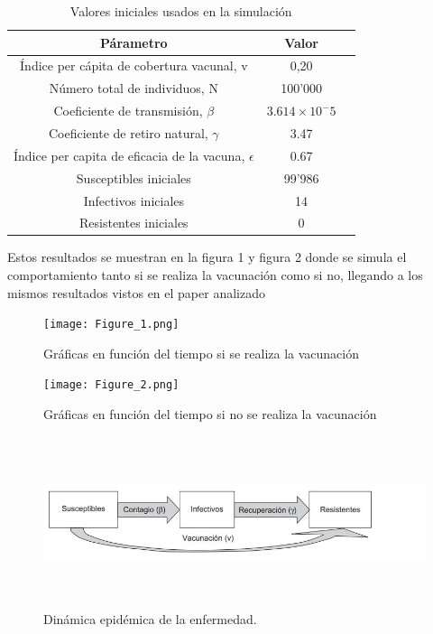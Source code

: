 \documentclass{wscpaperproc}
\theoremstyle{wsc}
\begin{document}
\begin{table}[htbp]
  \centering
  \caption{Valores iniciales usados en la simulación}
  \begin{tabular}{|c|c|c|}
    \hline
    \textbf{Párametro} & \textbf{Valor} \\
    \hline
    Índice per cápita de cobertura vacunal, v & 0,20 \\
    Número total de individuos, N & 100'000\\
	Coeficiente de transmisión, $\beta$ & $ 3.614\times10^-5$\\
	Coeficiente de retiro natural, $\gamma$ & 3.47\\
	Índice per capita de eficacia de la vacuna, $\epsilon$ & 0.67\\
	Susceptibles iniciales &99'986\\
	Infectivos iniciales & 14\\
	Resistentes iniciales & 0\\
    \hline
  \end{tabular}
\end{table}

Estos resultados se muestran en la figura 1 y figura 2 donde se simula
el comportamiento tanto si se realiza la vacunación como si no, llegando
a los mismos resultados vistos en el paper analizado

\begin{figure}
	\centering
	\texttt{[image: Figure\_1.png]}
	\caption{Gráficas en función del tiempo si se realiza la vacunación}
\end{figure}

\begin{figure}
	\centering
	\centering
	\texttt{[image: Figure\_2.png]}
	\caption{Gráficas en función del tiempo si no se realiza la vacunación}\centering
\end{figure}

\newpage

\begin{figure}
	\centering
	\includegraphics[width=1.0\textwidth,height=5cm]{fig4.jpg}
	\caption{Dinámica epidémica de la enfermedad.}
\end{figure}
\end{document}
